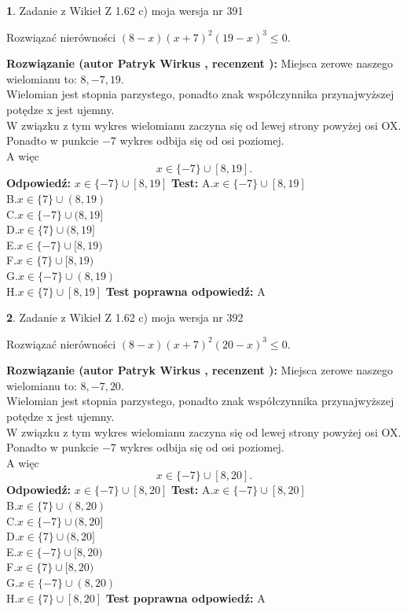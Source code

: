 \documentclass[12pt, a4paper]{article}
\theoremstyle{definition} %
\newtheorem{zad}{}
\newcommand{\zadStart}[1]{\begin{zad}#1\newline}
\newcommand{\zadStop}{\end{zad}}
\newcommand{\rozwStart}[2]{\noindent \textbf{Rozwiązanie (autor #1 , recenzent #2): }\newline}
\newcommand{\rozwStop}{\newline}
\newcommand{\odpStart}{\noindent \textbf{Odpowiedź:}\newline}
\newcommand{\odpStop}{\newline}
\newcommand{\testStart}{\noindent \textbf{Test:}\newline}
\newcommand{\testStop}{\newline}
\newcommand{\kluczStart}{\noindent \textbf{Test poprawna odpowiedź:}\newline}
\newcommand{\kluczStop}{\newline}
\begin{document}
\zadStart{Zadanie z Wikieł Z 1.62 c) moja wersja nr 391}

Rozwiązać nierówności $(8-x)(x+7)^{2}(19-x)^{3}\le0$.
\zadStop
\rozwStart{Patryk Wirkus}{}
Miejsca zerowe naszego wielomianu to: $8, -7, 19$.\\
Wielomian jest stopnia parzystego, ponadto znak współczynnika przy\linebreak najwyższej potędze x jest ujemny.\\ W związku z tym wykres wielomianu zaczyna się od lewej strony powyżej osi OX.\\
Ponadto w punkcie $-7$ wykres odbija się od osi poziomej.\\
A więc $$x \in \{-7\} \cup [8,19].$$
\rozwStop
\odpStart
$x \in \{-7\} \cup [8,19]$
\odpStop
\testStart
A.$x \in \{-7\} \cup [8,19]$\\
B.$x \in \{7\} \cup (8,19)$\\
C.$x \in \{-7\} \cup (8,19]$\\
D.$x \in \{7\} \cup (8,19]$\\
E.$x \in \{-7\} \cup [8,19)$\\
F.$x \in \{7\} \cup [8,19)$\\
G.$x \in \{-7\} \cup (8,19)$\\
H.$x \in \{7\} \cup [8,19]$
\testStop
\kluczStart
A
\kluczStop



\zadStart{Zadanie z Wikieł Z 1.62 c) moja wersja nr 392}

Rozwiązać nierówności $(8-x)(x+7)^{2}(20-x)^{3}\le0$.
\zadStop
\rozwStart{Patryk Wirkus}{}
Miejsca zerowe naszego wielomianu to: $8, -7, 20$.\\
Wielomian jest stopnia parzystego, ponadto znak współczynnika przy\linebreak najwyższej potędze x jest ujemny.\\ W związku z tym wykres wielomianu zaczyna się od lewej strony powyżej osi OX.\\
Ponadto w punkcie $-7$ wykres odbija się od osi poziomej.\\
A więc $$x \in \{-7\} \cup [8,20].$$
\rozwStop
\odpStart
$x \in \{-7\} \cup [8,20]$
\odpStop
\testStart
A.$x \in \{-7\} \cup [8,20]$\\
B.$x \in \{7\} \cup (8,20)$\\
C.$x \in \{-7\} \cup (8,20]$\\
D.$x \in \{7\} \cup (8,20]$\\
E.$x \in \{-7\} \cup [8,20)$\\
F.$x \in \{7\} \cup [8,20)$\\
G.$x \in \{-7\} \cup (8,20)$\\
H.$x \in \{7\} \cup [8,20]$
\testStop
\kluczStart
A
\kluczStop
\end{document}
